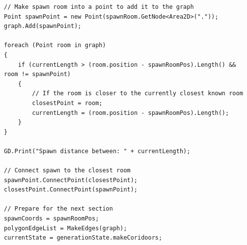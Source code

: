 \documentclass{article}
\begin{document}
\begin{lstlisting}
// Make spawn room into a point to add it to the graph
Point spawnPoint = new Point(spawnRoom.GetNode<Area2D>("."));
graph.Add(spawnPoint);

foreach (Point room in graph)
{
    if (currentLength > (room.position - spawnRoomPos).Length() && room != spawnPoint)
    {
        // If the room is closer to the currently closest known room
        closestPoint = room;
        currentLength = (room.position - spawnRoomPos).Length();
    }
}

GD.Print("Spawn distance between: " + currentLength);

// Connect spawn to the closest room
spawnPoint.ConnectPoint(closestPoint);
closestPoint.ConnectPoint(spawnPoint);

// Prepare for the next section
spawnCoords = spawnRoomPos;
polygonEdgeList = MakeEdges(graph);
currentState = generationState.makeCoridoors;
\end{lstlisting}
\end{document}
